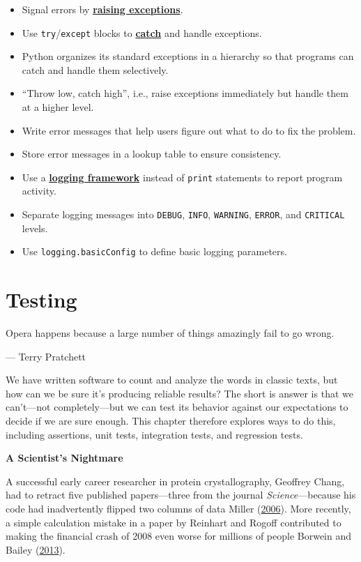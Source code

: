 \documentclass[
]{krantz}
\providecommand{\tightlist}{%
  \setlength{\itemsep}{0pt}\setlength{\parskip}{0pt}}
\renewenvironment{quote}{\begin{VF}}{\end{VF}}
\newcommand{\gref}[2]{\hyperlink{#2}{\textbf{#1}}}
\begin{document}
\begin{itemize}
\tightlist
\item
  Signal errors by \gref{raising exceptions}{raise\_exception}.
\item
  Use \texttt{try}/\texttt{except} blocks to \gref{catch}{catch\_exception} and handle exceptions.
\item
  Python organizes its standard exceptions in a hierarchy so that programs can catch and handle them selectively.
\item
  ``Throw low, catch high'', i.e., raise exceptions immediately but handle them at a higher level.
\item
  Write error messages that help users figure out what to do to fix the problem.
\item
  Store error messages in a lookup table to ensure consistency.
\item
  Use a \gref{logging framework}{logging\_framework} instead of \texttt{print} statements to report program activity.
\item
  Separate logging messages into \texttt{DEBUG}, \texttt{INFO}, \texttt{WARNING}, \texttt{ERROR}, and \texttt{CRITICAL} levels.
\item
  Use \texttt{logging.basicConfig} to define basic logging parameters.
\end{itemize}

\hypertarget{testing}{%
\chapter{Testing}\label{testing}}

\begin{quote}
Opera happens because a large number of things amazingly fail to go wrong.

--- Terry Pratchett
\end{quote}

We have written software to count and analyze the words in classic texts,
but how can we be sure it's producing reliable results?
The short is answer is that we can't---not completely---but
we can test its behavior against our expectations to decide if we are sure enough.
This chapter therefore explores ways to do this,
including assertions, unit tests, integration tests, and regression tests.

\begin{quote}
\textbf{A Scientist's Nightmare}

A successful early career researcher in protein crystallography,
Geoffrey Chang,
had to retract five published papers---three from
the journal \emph{Science}---because his code had
inadvertently flipped two columns of data Miller (\protect\hyperlink{ref-Miller2006}{2006}).
More recently, a simple calculation mistake in a paper by Reinhart and Rogoff
contributed to making the financial crash of 2008 even worse
for millions of people Borwein and Bailey (\protect\hyperlink{ref-Borw2013}{2013}).
\end{quote}
\end{document}
